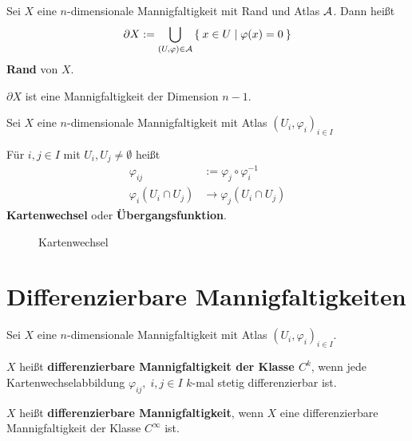 \begin{definition}%
    Sei $X$ eine $n$-dimensionale Mannigfaltigkeit mit Rand und
    Atlas $\mathcal{A}$. Dann heißt 
    \[\partial X := \bigcup_{(U, \varphi) \in \mathcal{A}} \Set{x \in U | \varphi (x) = 0}\]
    \textbf{Rand} von $X$.
\end{definition}

$\partial X$ ist eine Mannigfaltigkeit der Dimension $n-1$.

\begin{definition}%
    Sei $X$ eine $n$-dimensionale Mannigfaltigkeit mit Atlas
    $(U_i, \varphi_i)_{i \in I}$

    Für $i, j \in I$ mit $U_i, U_j \neq \emptyset$ heißt
              \begin{align*}
                \varphi_{ij} &:= \varphi_j \circ \varphi_i^{-1}\\
                \varphi_i (U_i \cap U_j) &\rightarrow \varphi_j (U_i \cap U_j)
              \end{align*}
              \textbf{Kartenwechsel} oder \textbf{Übergangsfunktion}.
\end{definition}

\begin{figure}[htp]
    \centering
    
    \caption{Kartenwechsel}
    \label{fig:kartenwechsel}
\end{figure}

\section{Differenzierbare Mannigfaltigkeiten}\label{sec:8}
\begin{definition}%
    Sei $X$ eine $n$-dimensionale Mannigfaltigkeit mit Atlas $(U_i, \varphi_i)_{i \in I}$.

    \begin{defenum}
        \item $X$ heißt \textbf{differenzierbare Mannigfaltigkeit der Klasse $C^k$},
              wenn jede Kartenwechselabbildung $\varphi_{ij},\;i,j \in I$
              $k$-mal stetig differenzierbar ist.
        \item $X$ heißt \textbf{differenzierbare Mannigfaltigkeit},
              wenn $X$ eine differenzierbare Mannigfaltigkeit der
              Klasse $C^\infty$ ist.
    \end{defenum}
\end{definition}

